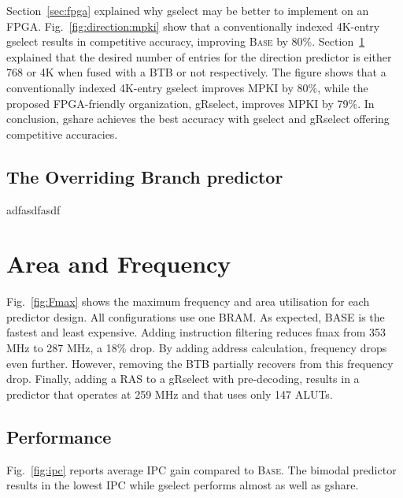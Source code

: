 
Section~\ref{sec:fpga} explained why gselect may be better to implement on an FPGA. Fig.~\ref{fig:direction:mpki} show that a conventionally indexed 4K-entry gselect results in competitive accuracy, improving \textsc{Base} by 80\%. Section~\ref{sec:eval:fpga} explained that the desired number of entries for the direction predictor is either 768  or 4K when  fused with a  BTB or not respectively. The figure shows that a conventionally indexed 4K-entry gselect improves MPKI by 80\%, while the proposed FPGA-friendly organization, gRselect, improves MPKI by 79\%.
In conclusion, gshare achieves the best accuracy with gselect and gRselect offering competitive accuracies.

\subsection{The Overriding Branch predictor}
\label{sec:eval:direction:override}

adfasdfasdf




\section{Area and Frequency}
\label{sec:eval:fpga}

Fig.~\ref{fig:Fmax} shows the maximum frequency and area utilisation for each predictor design. All configurations use one BRAM. As expected, BASE is the fastest and least expensive. Adding instruction filtering reduces fmax from 353 MHz to 287 MHz, a 18\% drop. By adding address calculation, frequency drops even further. However, removing the BTB partially recovers from this frequency drop. Finally, adding a RAS to a gRselect with pre-decoding, results in a predictor that operates at 259 MHz and that uses only 147 ALUTs.


\subsection{Performance}
\label{sec:eval:performance}

Fig.~\ref{fig:ipc} reports  average IPC gain compared to \textsc{Base}. The bimodal predictor results in the lowest IPC  while gselect performs almost as well as gshare.

